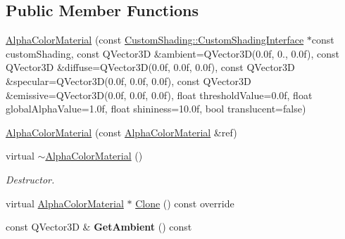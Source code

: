 \subsection*{Public Member Functions}
\begin{DoxyCompactItemize}
\item 
\mbox{\hyperlink{class_geometry_engine_1_1_geometry_material_1_1_alpha_color_material_a6ec6f1a3a9987b1df5fca1a49d30188f}{Alpha\+Color\+Material}} (const \mbox{\hyperlink{class_geometry_engine_1_1_custom_shading_1_1_custom_shading_interface}{Custom\+Shading\+::\+Custom\+Shading\+Interface}} $\ast$const custom\+Shading, const Q\+Vector3D \&ambient=Q\+Vector3D(0.\+0f, 0., 0.\+0f), const Q\+Vector3\+D \&diffuse=\+Q\+Vector3\+D(0.\+0f, 0.\+0f, 0.\+0f), const Q\+Vector3\+D \&specular=\+Q\+Vector3\+D(0.\+0f, 0.\+0f, 0.\+0f), const Q\+Vector3\+D \&emissive=\+Q\+Vector3\+D(0.\+0f, 0.\+0f, 0.\+0f), float threshold\+Value=0.\+0f, float global\+Alpha\+Value=1.\+0f, float shininess=10.\+0f, bool translucent=false)
\item 
\mbox{\hyperlink{class_geometry_engine_1_1_geometry_material_1_1_alpha_color_material_aa7ae35b575575646ddc88cb95dd4a8b4}{Alpha\+Color\+Material}} (const \mbox{\hyperlink{class_geometry_engine_1_1_geometry_material_1_1_alpha_color_material}{Alpha\+Color\+Material}} \&ref)
\item 
\mbox{\label{class_geometry_engine_1_1_geometry_material_1_1_alpha_color_material_afd1fa560c390f48a95d7c6574cbdfcca}} 
virtual \mbox{\hyperlink{class_geometry_engine_1_1_geometry_material_1_1_alpha_color_material_afd1fa560c390f48a95d7c6574cbdfcca}{$\sim$\+Alpha\+Color\+Material}} ()
\begin{DoxyCompactList}\small\item\em Destructor. \end{DoxyCompactList}\item 
virtual \mbox{\hyperlink{class_geometry_engine_1_1_geometry_material_1_1_alpha_color_material}{Alpha\+Color\+Material}} $\ast$ \mbox{\hyperlink{class_geometry_engine_1_1_geometry_material_1_1_alpha_color_material_a932e340f71f7afd3088a44c29560744c}{Clone}} () const override
\item 
\mbox{\label{class_geometry_engine_1_1_geometry_material_1_1_alpha_color_material_aa0612c081b76090445a0486392a44c6e}} 
const Q\+Vector3D \& {\bfseries Get\+Ambient} () const

\end{DoxyCompactItemize}
